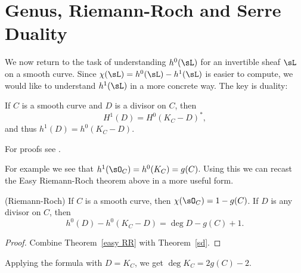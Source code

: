 \section{Genus, Riemann-Roch and Serre Duality}

We now return to the task of understanding $h^0(\sL)$ for an invertible sheaf $\sL$ on a smooth curve. Since $\chi(\sL) = h^0(\sL)-h^1(\sL)$ is easier to compute, we would like to understand $h^1(\sL)$ in a more concrete way. The key is duality:


%
%
%
%
% 
 
\begin{theorem}\label{sd}
If $C$ is a smooth curve and $D$ is a divisor on $C$, then
$$
H^1(D) =H^0(K_C-D)^*,
$$
and thus $h^1(D) = h^0(K_C-D)$.
\end{theorem}

For proofs see \cite[Theorem III.5.2 and III.7.6]{H}. 

For example we see that $h^1 (\sO_C) = h^0(K_C) = g(C)$.   
Using this we can recast the Easy Riemann-Roch theorem above in a more useful form. 

\begin{theorem} (Riemann-Roch)
If $C$ is a smooth curve, then $\chi(\sO_C) = 1-g(C)$.
If $D$ is any divisor on $C$, then 
$$
h^0(D) - h^0(K_C -D) = \deg D - g(C) +1.
$$
\end{theorem}

\begin{proof}
Combine Theorem~\ref{easy RR} with Theorem~\ref{sd}.
\end{proof}
Applying the formula with $D = K_C$, we get 
$\deg K_C = 2g(C) -2$.

